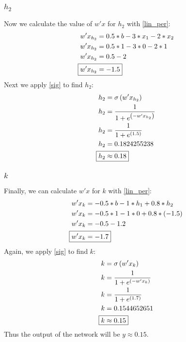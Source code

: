 \documentclass[12pt,letterpaper]{article}
\begin{document}
\subsubsection*{$h_2$}
Now we calculate the value of $w'x$ for $h_2$ with \eqref{lin_per}:
\begin{align*}
w'x_{h_2} &= 0.5*b - 3*x_1 - 2*x_2\\
w'x_{h_2} &= 0.5*1 - 3*0 - 2*1\\
w'x_{h_2} &= 0.5 - 2\\
\Aboxed{w'x_{h_2} &= -1.5}
\end{align*}
Next we apply \eqref{sig} to find $h_2$:
\begin{align*}
h_2 &= \sigma\left(w'x_{h_2}\right)\\
h_2 &= \frac{1}{1+e^{\left(-w'x_{h_2}\right)}}\\
h_2 &= \frac{1}{1+e^{\left(1.5\right)}}\\
h_2 &= 0.1824255238\\
\Aboxed{h_2 &\approx 0.18}
\end{align*}
\subsubsection*{$k$}
Finally, we can calculate $w'x$ for $k$ with \eqref{lin_per}:
\begin{align*}
w'x_k &= -0.5*b - 1*h_1 + 0.8*h_2\\
w'x_k &= -0.5*1 - 1*0 + 0.8*\left(-1.5\right)\\
w'x_k &= -0.5 - 1.2\\
\Aboxed{w'x_k &= -1.7}
\end{align*}
Again, we apply \eqref{sig} to find $k$:
\begin{align*}
k &= \sigma\left(w'x_{k}\right)\\
k &= \frac{1}{1+e^{\left(-w'x_{k}\right)}}\\
k &= \frac{1}{1+e^{\left(1.7\right)}}\\
k &= 0.1544652651\\
\Aboxed{k &\approx 0.15}
\end{align*}
Thus the output of the network will be $y\approx0.15$.
\end{document}
